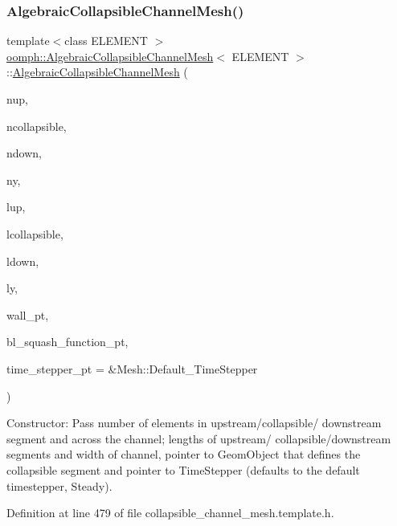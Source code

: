 \subsubsection{\texorpdfstring{Algebraic\+Collapsible\+Channel\+Mesh()}{AlgebraicCollapsibleChannelMesh()}\hspace{0.1cm}{\footnotesize\ttfamily [2/2]}}
{\footnotesize\ttfamily template$<$class E\+L\+E\+M\+E\+NT $>$ \\
\hyperlink{classoomph_1_1AlgebraicCollapsibleChannelMesh}{oomph\+::\+Algebraic\+Collapsible\+Channel\+Mesh}$<$ E\+L\+E\+M\+E\+NT $>$\+::\hyperlink{classoomph_1_1AlgebraicCollapsibleChannelMesh}{Algebraic\+Collapsible\+Channel\+Mesh} (\begin{DoxyParamCaption}\item[{const unsigned \&}]{nup,  }\item[{const unsigned \&}]{ncollapsible,  }\item[{const unsigned \&}]{ndown,  }\item[{const unsigned \&}]{ny,  }\item[{const double \&}]{lup,  }\item[{const double \&}]{lcollapsible,  }\item[{const double \&}]{ldown,  }\item[{const double \&}]{ly,  }\item[{Geom\+Object $\ast$}]{wall\+\_\+pt,  }\item[{\hyperlink{classoomph_1_1CollapsibleChannelDomain_a2bf1d7943bfac134a5c27a54c7e1faed}{Collapsible\+Channel\+Domain\+::\+B\+L\+Squash\+Fct\+Pt}}]{bl\+\_\+squash\+\_\+function\+\_\+pt,  }\item[{Time\+Stepper $\ast$}]{time\+\_\+stepper\+\_\+pt = {\ttfamily \&Mesh\+:\+:Default\+\_\+TimeStepper} }\end{DoxyParamCaption})\hspace{0.3cm}{\ttfamily [inline]}}



Constructor\+: Pass number of elements in upstream/collapsible/ downstream segment and across the channel; lengths of upstream/ collapsible/downstream segments and width of channel, pointer to Geom\+Object that defines the collapsible segment and pointer to Time\+Stepper (defaults to the default timestepper, Steady). 



Definition at line 479 of file collapsible\+\_\+channel\+\_\+mesh.\+template.\+h.



